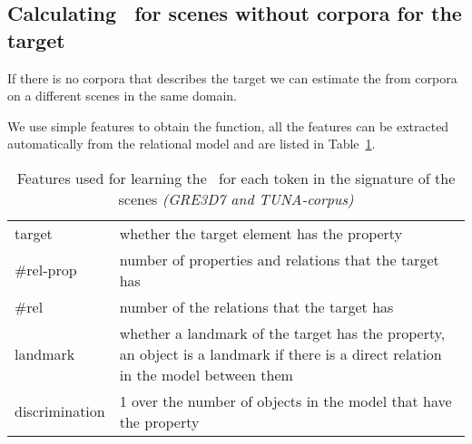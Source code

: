 \subsection{Calculating \puse\ for scenes without corpora for the target} \label{subsec:learning}

If there is no corpora that describes the target we can estimate the \puse from corpora on a different scenes in the same domain. 

We use simple features to obtain the function, all the features can be extracted automatically from the relational model 
and are listed 
in Table~\ref{features}.  

\begin{small}
\begin{table}[h!]
\begin{center}
\begin{tabular}{|l|p{10cm}|}
\hline
target & whether the target element has the property \\
\#rel-prop & number of properties and relations that the target has\\
\#rel & number of the relations that the target has \\
landmark & whether a landmark of the target has the property, an object is a landmark if there is a direct relation in the model 
between them \\
discrimination & 1 over the number of objects in the model that have the property \\
\hline
\end{tabular}
\caption{Features used for learning the \puse ~for each token in the signature of the scenes \textit{(GRE3D7 and TUNA-corpus)} \label{features}}
\end{center}
\end{table}
\end{small}

